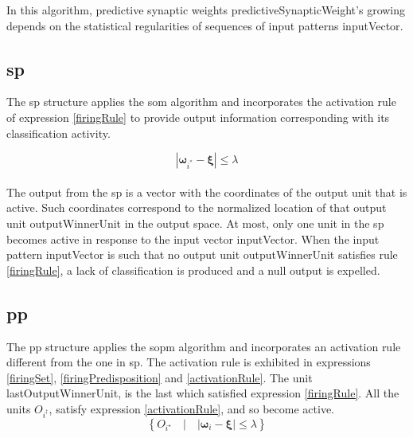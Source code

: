 \documentclass[11pt,a4paper]{article}
\begin{document}
\begin{appendices}
In this algorithm, predictive synaptic weights \ac{predictiveSynapticWeight}'s growing
depends on the statistical regularities of sequences of input patterns \ac{inputVector}.\\

\subsection{\ac{sp}} \label{sp}

The \ac{sp} structure applies the \ac{som} algorithm and incorporates the activation rule
of expression \ref{firingRule} to provide output information
corresponding with its classification activity.

\begin{equation} \label{firingRule}
|\boldsymbol{\omega}_{i^*} - \boldsymbol{\xi}| \leq \lambda
\end{equation}\\

The output from the \ac{sp} is a vector with the coordinates of the output unit that is active.
Such coordinates correspond to the normalized location of that output unit \ac{outputWinnerUnit} in the output space.
At most, only one unit in the \ac{sp} becomes active in response to the input vector \ac{inputVector}.
When the input pattern \ac{inputVector} is such that no output unit \ac{outputWinnerUnit} satisfies rule \ref{firingRule},
a lack of classification is produced and a null output is expelled.\\

\subsection{\ac{pp}} \label{pp}

The \ac{pp} structure applies the \ac{sopm} algorithm and incorporates an
activation rule different from the one in \ac{sp}.
The activation rule is exhibited in expressions \ref{firingSet}, \ref{firingPredisposition} and \ref{activationRule}.
The unit \ac{lastOutputWinnerUnit}, is the last which satisfied expression \ref{firingRule}.
All the units $O_{i^{\dagger}}$, satisfy expression \ref{activationRule}, and so become active.\\

\begin{equation} \label{firingSet}
\left \{ O_{i^{\star}} \quad | \quad |\boldsymbol{\omega}_i - \boldsymbol{\xi}| \leq \lambda \right \}
\end{equation}


\end{appendices}
\end{document}
